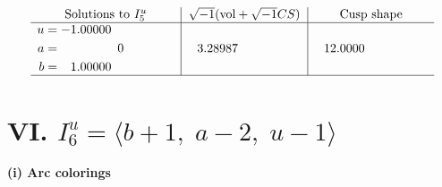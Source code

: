 \documentclass[1p]{elsarticle_modified}
\theoremstyle{definition}
\newcommand{\I}{\sqrt{-1}}
\begin{document}
$$\begin{array}{c|c|c}  
\text{Solutions to }I^u_{5}& \I (\text{vol} + \sqrt{-1}CS) & \text{Cusp shape}\\
 \hline 
\begin{aligned}
u &= -1.00000\phantom{ +0.000000I} \\
a &= \phantom{-0.000000 } 0 \\
b &= \phantom{-}1.00000\phantom{ +0.000000I}\end{aligned}
 & \phantom{-}3.28987\phantom{ +0.000000I} & \phantom{-}12.0000\phantom{ +0.000000I}\\
 \hline 
 \end{array}$$\newpage\newpage\renewcommand{\arraystretch}{1}
\centering \section*{VI. $I^u_{6}= \langle b+1,\;a-2,\;u-1 \rangle$}
\flushleft \textbf{(i) Arc colorings}\\
\end{document}
